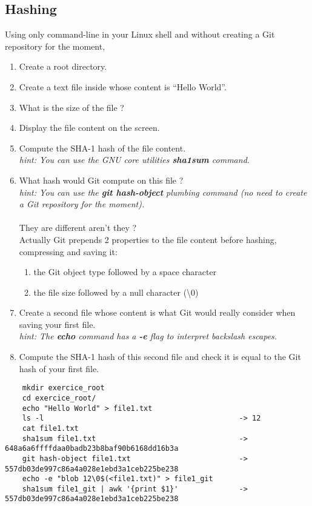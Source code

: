 \subsection{Hashing}  %
Using only command-line in your Linux shell and without creating a Git repository for the moment,
\begin{enumerate}
    \item Create a root directory.
    \item Create a text file inside whose content is ``Hello World''.
    \item What is the size of the file ?
    \item Display the file content on the screen.
    \item Compute the SHA-1 hash of the file content. \\
        \textit{hint: You can use the GNU core utilities \textbf{sha1sum} command.}
    \item What hash would Git compute on this file ? \\
        \textit{hint: You can use the \textbf{git hash-object} plumbing command
        (no need to create a Git repository for the moment).} \\
        \\
        They are different aren't they ? \\
        Actually Git prepends 2 properties to the file content before hashing, compressing and saving it:
        \begin{enumerate}
            \item the Git object type followed by a space character
            \item the file size followed by a null character (\textbackslash0)
        \end{enumerate}
    \item Create a second file whose content is what Git would really consider when saving your first file. \\
        \textit{hint: The \textbf{echo} command has a \textbf{-e} flag to interpret backslash escapes.}
    \item Compute the SHA-1 hash of this second file and check it is equal to the Git hash of your first file.
\end{enumerate}

\ifdefined\answer
\begin{verbatim}
    mkdir exercice_root
    cd exercice_root/
    echo "Hello World" > file1.txt
    ls -l                                             -> 12
    cat file1.txt
    sha1sum file1.txt                                 -> 648a6a6ffffdaa0badb23b8baf90b6168dd16b3a
    git hash-object file1.txt                         -> 557db03de997c86a4a028e1ebd3a1ceb225be238
    echo -e "blob 12\0$(<file1.txt)" > file1_git
    sha1sum file1_git | awk '{print $1}'              -> 557db03de997c86a4a028e1ebd3a1ceb225be238
\end{verbatim}
\fi


